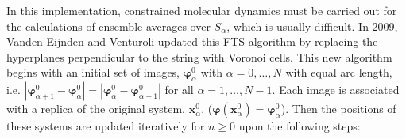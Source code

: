 In this implementation, constrained molecular dynamics must be carried out for the calculations of ensemble averages over $S_{\alpha}$, which is usually difficult. In 2009, Vanden-Eijnden and Venturoli updated this FTS algorithm by replacing the hyperplanes perpendicular to the string with Voronoi cells.\cite{Vanden-EijndenJCP2009} This new algorithm begins with an initial set of images, $\boldsymbol{\varphi}_\alpha^0$ with $\alpha=0,\dots,N$ with equal arc length, i.e. $|\boldsymbol{\varphi}_{\alpha+1}^0-\boldsymbol{\varphi}_{\alpha}^0|=|\boldsymbol{\varphi}_{\alpha}^0-\boldsymbol{\varphi}_{\alpha-1}^0|$ for all $\alpha=1,\dots,N-1$. Each image is associated with a replica of the original system, $\mathbf{x}_\alpha^0$, ($\boldsymbol{\varphi}(\mathbf{x}_\alpha^0)=\boldsymbol{\varphi}_{\alpha}^0$). Then the positions of these systems are updated iteratively for $n\ge0$ upon the following steps:
